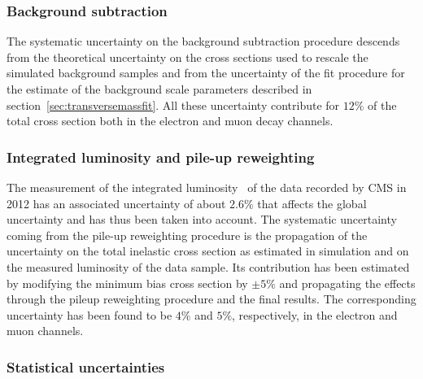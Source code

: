 \subsubsection{Background subtraction}

The systematic uncertainty on the background subtraction procedure 
descends from the theoretical uncertainty on the cross sections used to rescale
the simulated background samples and from the uncertainty of the fit 
procedure for the estimate of the background scale parameters described in 
section~\ref{sec:transversemassfit}. 
All these uncertainty contribute for $12\%$ of the total cross section both 
in the electron and muon decay channels.

\subsubsection{Integrated luminosity and pile-up reweighting}

The measurement of the integrated luminosity~\cite{luminosity} 
of the data recorded by CMS in 2012
has an associated uncertainty of about $2.6\%$ that affects the global
uncertainty and has thus been taken into account.
The systematic uncertainty coming from the pile-up reweighting
procedure is the propagation of the uncertainty on the total inelastic 
cross section as estimated in simulation and on the measured luminosity 
of the data sample.
Its contribution has been estimated by 
modifying the minimum bias cross section 
by $\pm 5 \%$ and propagating the effects through the 
pileup reweighting procedure and the final results. 
The corresponding uncertainty has been found to be $4\%$ and $5\%$,
respectively, in the electron and muon channels.

\subsubsection{Statistical uncertainties}


